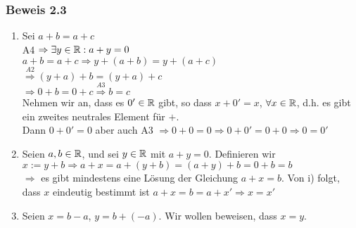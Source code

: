 \begin{enumerate}
\subsubsection*{Beweis 2.3}
\begin{enumerate}
\item Sei $a+b=a+c$\\ A4 $\Rightarrow\exists y\in\mathbb{R}:a+y=0$\\$a+b=a+c\Rightarrow y+(a+b)=y+(a+c)$\\$\mathop  \Rightarrow \limits^{A2} (y+a)+b=(y+a)+c$\\$\Rightarrow 0+b=0+c \mathop  \Rightarrow \limits^{A3} b=c$\\
Nehmen wir an, dass es $0'\in\mathbb{R}$ gibt, so dass $x+0'=x$, $\forall x\in\mathbb{R}$, d.h. es gibt ein zweites neutrales Element für $+$.\\

\noindent Dann $0+0'=0$ aber auch A3 $\Rightarrow 0+0=0\Rightarrow 0+0'=0+0\Rightarrow 0=0'$
\item Seien $a,b\in\mathbb{R}$, und sei $y\in\mathbb{R}$ mit $a+y=0$. Definieren wir $x:=y+b\Rightarrow a+x=a+(y+b)=(a+y)+b=0+b=b$\\
$\Rightarrow$ es gibt mindestens eine Lösung der Gleichung $a+x=b$. Von i) folgt, dass $x$ eindeutig bestimmt ist $a+x=b=a+x' \Rightarrow x=x'$
\item Seien $x=b-a$, $y=b+(-a)$. Wir wollen beweisen, dass $x=y$.\\


\end{enumerate}
\end{enumerate}
